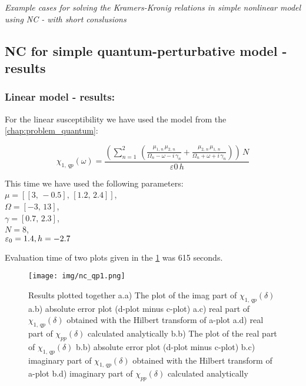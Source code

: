\documentclass[12pt,twoside,a4paper]{article}
\numberwithin{equation}{subsection}
\numberwithin{figure}{subsection}
\begin{document}
\textit{Example cases for solving the Kramers-Kronig relations in simple nonlinear model using NC - with short conslusions}

\subsection{NC for simple quantum-perturbative model - results} \label{chap:nc_quantum}

\subsubsection*{Linear model - results:}

For the linear susceptibility we have used the model from the \ref{chap:problem_quantum}: 

\begin{equation} \label{nclin_chipp}
  {\chi_{1, \,qp}}(\omega ) = \frac { \left(  \! \sum_{n=1}^{2}\,(\frac {{\mu_{1, \,n}}\,{ \mu_{2, \,n}}}{{\Omega_{n}} - \omega  -
  i\,{\gamma_{n}}} + \frac {{\mu_{2, \,n}}\,{\mu_{1, \,n}}}{{\Omega_{n}} + \omega + i\,{\gamma_{n}}}) \!  \right) \,N}{\varepsilon
  0\,h}
\end{equation}

This time we have used the following parameters: \\
$\mu = [[3, \, - 0.5], \,[1.2, \,2.4]]$, \\ 
$\Omega =[ - 3, \,13]$, \\
$\gamma =[0.7, \,2.3]$, \\ 
$N=8$, \\ 
${\varepsilon_{0}}=1.4, \\
h= - 2.7$

Evaluation time of two plots given in the \ref{fig:nc_qp1} was 615 seconds.

\begin{figure}
  \texttt{[image: img/nc\_qp1.png]}
  \caption{Results plotted together 
    a.a) The plot of the imag part of ${\chi_{1, \,qp}}(\delta )$
    a.b) absolute error plot (d-plot minus c-plot) 
    a.c) real part of ${\chi_{1, \,qp}}(\delta )$ obtained with the Hilbert transform of a-plot 
    a.d) real part of ${\chi_{pp}}(\delta )$ calculated analytically 
    b.b) The plot of the real part of ${\chi_{1, \,qp}}(\delta )$ 
    b.b) absolute error plot (d-plot minus c-plot) 
    b.c) imaginary part of ${\chi_{1, \,qp}}(\delta )$ obtained with the Hilbert transform of a-plot 
    b.d) imaginary part of ${\chi_{pp}}(\delta )$ calculated analytically  
    \label{fig:nc_qp1}
  }
\end{figure}
\end{document}
